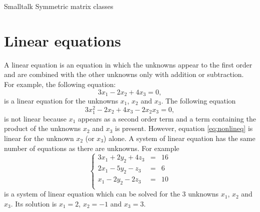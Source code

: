 \begin{listing}[label=lst:symatrix]{Smalltalk}
{Symmetric matrix classes}
%
\end{listing}

\section{Linear equations}
\label{sec:lineqs} A linear equation is an equation in which the
unknowns appear to the first order and are combined with the other
unknowns only with addition or subtraction. For example, the
following equation:
\begin{equation}
  3x_1-2x_2+4x_3=0,
\end{equation}
is a linear equation for the unknowns $x_1$, $x_2$ and $x_3$. The
following equation
\begin{equation}
\label{eq:nonlineq}
  3x_1^2-2x_2+4x_3 - 2 x_2 x_3=0,
\end{equation}
is not linear because $x_1$ appears as a second order term and a
term containing the product of the unknowns $x_2$ and $x_3$ is
present. However, equation \ref{eq:nonlineq} is linear for the
unknown $x_2$ (or $x_3$) alone. A system of linear equation has
the same number of equations as there are unknowns. For example
\begin{equation}
\label{eq:lineqex}
  \left\{
  \begin{array}{lcr}
  3x_1+2y_2+4z_3&=&16\\
  2x_1-5y_2-z_3&=&6\\
  x_1-2y_2-2z_3&=&10\\
\end{array}\right.
\end{equation}
is a system of linear equation which can be solved for the 3
unknowns $x_1$, $x_2$ and $x_3$. Its solution is $x_1=2$, $x_2=-1$
and $x_3=3$.

